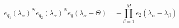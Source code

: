 \begin{equation}
e_{q_{1}}(\lambda_{\alpha})^{N}e_{q_{2}}(\lambda_{\alpha})^{N}e_{q}(\lambda_{\alpha}-\Theta)=
-\prod_{\beta=1}^{M} e_2(\lambda_{\alpha}-\lambda_{\beta})
\label{BEI}
\end{equation}

